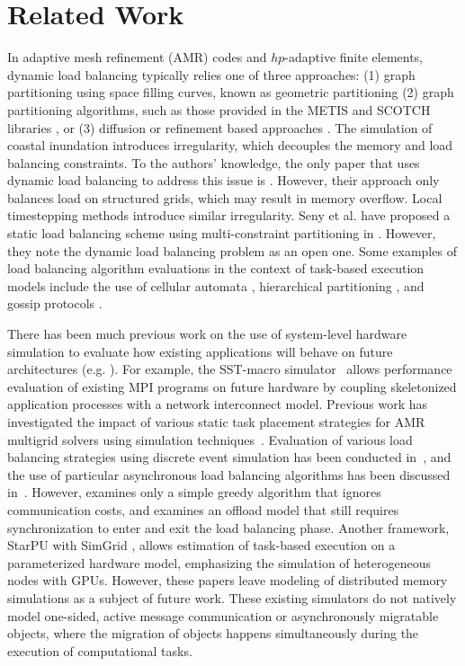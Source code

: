\section{Related Work}
\label{sec:related}

In adaptive mesh refinement (AMR) codes and $hp$-adaptive finite elements, dynamic load balancing typically relies one of three approaches: (1) graph partitioning using space filling curves, known as geometric partitioning \cite{zoltan1,OG,blaise,Ferreira2017} (2) graph partitioning algorithms, such as those provided in the METIS and SCOTCH libraries \cite{realscotch,scotch,realmetis,zoltan1,rmmetis}, or (3) diffusion or refinement based approaches \cite{diff1}.
The simulation of coastal inundation introduces irregularity, which decouples the memory and load balancing constraints.
To the authors' knowledge, the only paper that uses dynamic load balancing to address this issue is \cite{wdgpu}. However, their approach only balances load on structured grids, which may result in memory overflow.
Local timestepping methods introduce similar irregularity.
Seny et al. have proposed a static load balancing scheme using multi-constraint partitioning in \cite{seny}.
However, they note the dynamic load balancing problem as an open one.
Some examples of load balancing algorithm evaluations in the context of task-based execution models include the use of cellular automata \cite{ca}, hierarchical partitioning \cite{charmha}, and gossip protocols \cite{charmgossip}.

There has been much previous work on the use of system-level hardware simulation to evaluate how existing applications will behave on future architectures (e.g. \cite{Janssen:2011,Mubarak:2014,Zhang:2016,Jain:2016,Barrett:2012}).
For example, the SST-macro simulator~\cite{janssen10-ijdst} allows performance evaluation of existing MPI programs on future hardware by coupling skeletonized application processes with a network interconnect model.
Previous work has investigated the impact of various static task placement strategies for AMR multigrid solvers using simulation techniques~\cite{Chan:2016}.
Evaluation of various load balancing strategies using discrete event simulation has been conducted in~\cite{zheng-thesis}, and the use of particular asynchronous load balancing algorithms has been discussed in~\cite{zheng-async-lb,pearce-async-lb}.
However, \cite{zheng-async-lb} examines only a simple greedy algorithm that ignores communication costs, and \cite{pearce-async-lb} examines an offload model that still requires synchronization to enter and exit the load balancing phase.
Another framework, StarPU with SimGrid \cite{Stanisic2015,Stanisic2015fast}, allows estimation of task-based execution on a parameterized hardware model, emphasizing the simulation of heterogeneous nodes with GPUs. However, these papers leave modeling of distributed memory simulations as a subject of future work.
These existing simulators do not natively model one-sided, active message communication or asynchronously migratable objects, where the migration of objects happens simultaneously during the execution of computational tasks.

